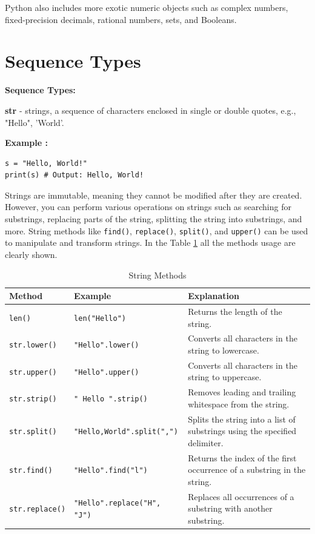 \documentclass[12pt]{book}
\newtheorem{Example}{Example}[chapter]
\renewenvironment{Example}{\begin{trivlist}\item\relax
\textbf{Example \thesection: }}{\end{trivlist}}
\begin{document}
Python also includes more exotic numeric objects such as complex numbers, fixed-precision decimals, rational numbers, sets, and Booleans. 


\section{Sequence Types}
\textbf{Sequence Types:}
\begin{itemize}
\item \textbf{str} - strings, a sequence of characters enclosed in single or double quotes, e.g., "Hello", 'World'.
\begin{Example}
\begin{lstlisting}
s = "Hello, World!"
print(s) # Output: Hello, World!
\end{lstlisting}
\end{Example}
Strings are immutable, meaning they cannot be modified after they are created. However, you can perform various operations on strings such as searching for substrings, replacing parts of the string, splitting the string into substrings, and more. String methods like \texttt{find()}, \texttt{replace()}, \texttt{split()}, and \texttt{upper()} can be used to manipulate and transform strings. In the Table \ref{tab:string-methods} all the methods usage are clearly shown.

\begin{table}[h]
\centering
\caption{String Methods}

\label{tab:string-methods}

\begin{tabular}{|l|l|p{7cm}|}
\hline
\textbf{Method} & \textbf{Example} & \textbf{Explanation} \\
\hline
\texttt{len()} & \texttt{len("Hello")} & Returns the length of the string. \\
\hline
\texttt{str.lower()} & \texttt{"Hello".lower()} & Converts all characters in the string to lowercase. \\
\hline
\texttt{str.upper()} & \texttt{"Hello".upper()} & Converts all characters in the string to uppercase. \\
\hline
\texttt{str.strip()} & \texttt{"  Hello  ".strip()} & Removes leading and trailing whitespace from the string. \\
\hline
\texttt{str.split()} & \texttt{"Hello,World".split(",")} & Splits the string into a list of substrings using the specified delimiter. \\
\hline
\texttt{str.find()} & \texttt{"Hello".find("l")} & Returns the index of the first occurrence of a substring in the string. \\
\hline
\texttt{str.replace()} & \texttt{"Hello".replace("H", "J")} & Replaces all occurrences of a substring with another substring. \\
\hline
\end{tabular}
\end{table}





\end{itemize}
\end{document}
